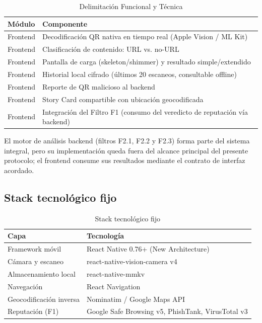 \begin{table}[H]
    \centering
    \caption{Delimitación Funcional y Técnica}
    \begin{tabular}{@{}ll@{}}
        \toprule
        \textbf{Módulo} & \textbf{Componente} \\
        \midrule
        Frontend & Decodificación QR nativa en tiempo real (Apple Vision / ML Kit) \\
        Frontend & Clasificación de contenido: URL vs. no-URL \\
        Frontend & Pantalla de carga (skeleton/shimmer) y resultado simple/extendido \\
        Frontend & Historial local cifrado (últimos 20 escaneos, consultable offline) \\
        Frontend & Reporte de QR malicioso al backend \\
        Frontend & Story Card compartible con ubicación geocodificada \\
        Frontend & Integración del Filtro F1 (consumo del veredicto de reputación vía backend) \\
        \bottomrule
    \end{tabular}
    \label{tab:delimitacion}
\end{table}

El motor de análisis backend (filtros F2.1, F2.2 y F2.3) forma parte del sistema integral, pero su implementación queda fuera del alcance principal del presente protocolo; el frontend consume sus resultados mediante el contrato de interfaz acordado.

\subsection{Stack tecnológico fijo}

\begin{table}[H]
    \centering
    \caption{Stack tecnológico fijo}
    \begin{tabular}{@{}ll@{}}
        \toprule
        \textbf{Capa} & \textbf{Tecnología} \\
        \midrule
        Framework móvil & React Native 0.76+ (New Architecture) \\
        Cámara y escaneo & react-native-vision-camera v4 \\
        Almacenamiento local & react-native-mmkv \\
        Navegación & React Navigation \\
        Geocodificación inversa & Nominatim / Google Maps API \\
        Reputación (F1) & Google Safe Browsing v5, PhishTank, VirusTotal v3 \\
        \bottomrule
    \end{tabular}
    \label{tab:stack}
\end{table}

